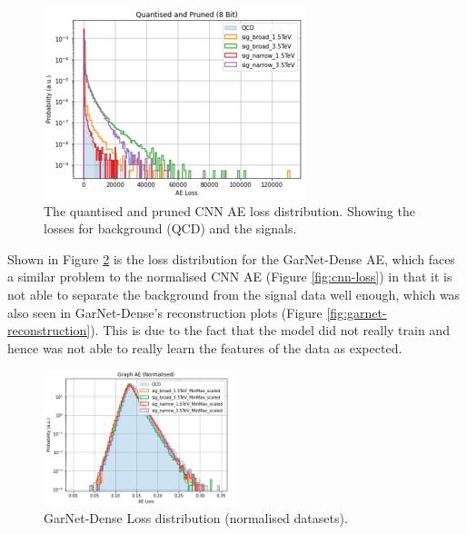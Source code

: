 \documentclass[a4paper]{article}
\theoremstyle{plain}
\theoremstyle{definition}
\begin{document}
\begin{figure}[H]
\begin{minipage}[c]{0.45\linewidth}
						\label{fig:cnn-loss}
					\end{minipage}
					\hfill
					\begin{minipage}[c]{0.45\linewidth}
						\centering
						\includegraphics[width=\textwidth]{cnn-compressed-loss.png}
						\caption{The quantised and pruned CNN AE loss distribution. Showing the losses for background (QCD) and the signals.}
						\label{fig:cnn-compressed-loss}
					\end{minipage}
			\end{figure}

			Shown in Figure \ref{fig:garnet-loss} is the loss distribution for the GarNet-Dense AE, which faces a similar problem to the normalised CNN AE (Figure \ref{fig:cnn-loss}) in that it is not able to separate the background from the signal data well enough, which was also seen in GarNet-Dense's reconstruction plots (Figure \ref{fig:garnet-reconstruction}). This is due to the fact that the model did not really train and hence was not able to really learn the features of the data as expected.

			\begin{figure}[H]
				\centering
				\begin{minipage}[b]{\linewidth}
					\centering
					\includegraphics[width=0.5\textwidth]{garnet-loss.png}
					\small\caption{GarNet-Dense Loss distribution (normalised datasets).}
					\label{fig:garnet-loss}
				\end{minipage}
			\end{figure}
\end{document}
